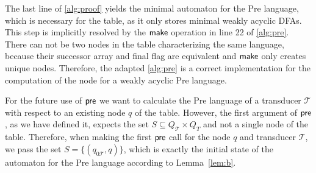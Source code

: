 \par 

The last line of \autoref{alg:proof} yields the minimal automaton for the Pre language, which is necessary for the table, as it only stores minimal weakly acyclic DFAs. This step is implicitly resolved by the $\operatorname{\textsf{make}}$ operation in line 22 of \autoref{alg:pre}. There can not be two nodes in the table characterizing the same language, because their successor array and final flag are equivalent and $\operatorname{\textsf{make}}$ only creates unique nodes.
Therefore, the adapted \autoref{alg:pre} is a correct implementation for the computation of the node for a weakly acyclic Pre language.

\par 

For the future use of $\operatorname{\textsf{pre}}$ we want to calculate the Pre language of a transducer $\mathcal{T}$ with respect to an existing node $q$ of the table. However, the first argument of $\operatorname{\textsf{pre}}$, as we have defined it, expects the set $S \subseteq Q_{\mathcal{T}} \times Q_{T}$ and not a single node of the table. Therefore, when making the first $\operatorname{\textsf{pre}}$ call for the node $q$ and transducer $\mathcal{T}$, we pass the set $S = \{ (q_{0\mathcal{T}},q) \}$, which is exactly the initial state of the automaton for the Pre language according to Lemma~\autoref{lem:b}.